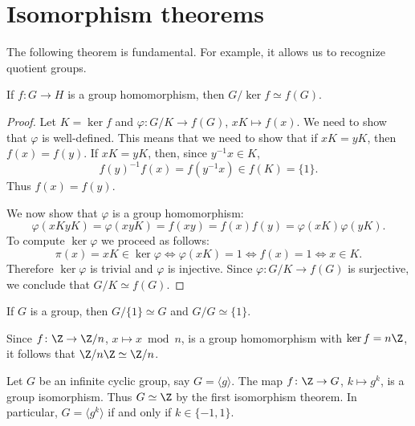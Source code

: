 
\section{Isomorphism theorems}

The following theorem is fundamental. For example, it allows us to recognize quotient groups. 

\begin{theorem}
If $f\colon G\to H$ is a group homomorphism, then $G/\ker f\simeq f(G)$.
\end{theorem}

\begin{proof}
    Let $K=\ker f$ and $\varphi\colon G/K\to f(G)$, $xK\mapsto f(x)$. We need to show that $\varphi$ is well-defined. This means that
    we need to show that if $xK=yK$, then $f(x)=f(y)$. If $xK=yK$, then, since $y^{-1}x\in K$, 
    \[
        f(y)^{-1}f(x)=f(y^{-1}x)\in f(K)=\{1\}.
    \]
    Thus $f(x)=f(y)$.

    We now show that $\varphi$ is a group homomorphism: 
        \[
        \varphi(xKyK)=\varphi(xyK)=f(xy)=f(x)f(y)=\varphi(xK)\varphi(yK).
        \]
    To compute $\ker\varphi$ we proceed as follows: 
        \[
        \pi(x)=xK\in\ker\varphi\Longleftrightarrow \varphi(xK)=1
        \Longleftrightarrow f(x)=1
        \Longleftrightarrow x\in K.
        \]
    Therefore  $\ker\varphi$ is trivial and
    $\varphi$ is injective. Since $\varphi\colon G/K\to f(G)$ is surjective, 
    we conclude that $G/K\simeq f(G)$.
\end{proof}

If $G$ is a group, then $G/\{1\}\simeq G$ and $G/G\simeq\{1\}$.

\begin{example}
Since $f\colon\Z\to\Z/n$, $x\mapsto x\bmod n$, is a group homomorphism
with $\ker f=n\Z$, it follows that 
$\Z/n\Z\simeq\Z/n$.
\end{example}

\begin{example}
Let $G$ be an infinite cyclic group, say $G=\langle g\rangle$. The map 
$f \colon\Z\to G$, $k\mapsto g^k$,
is a group isomorphism. Thus $G\simeq\Z$ by the first isomorphism theorem. In particular, $G=\langle g^k\rangle$ if and only if 
 $k\in\{-1,1\}$.
\end{example}

